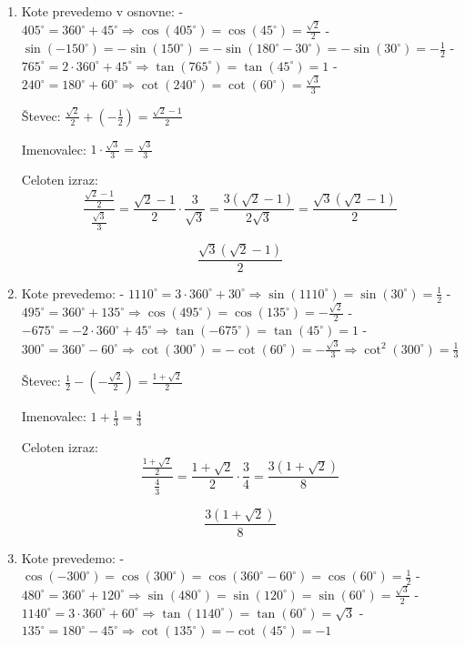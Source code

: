 \documentclass[a4paper,12pt]{letter}
\begin{document}
\newpage

\begin{enumerate}
\item 
Kote prevedemo v osnovne:
- \(405^\circ = 360^\circ + 45^\circ \Rightarrow \cos(405^\circ) = \cos(45^\circ) = \frac{\sqrt{2}}{2}\)
- \(\sin(-150^\circ) = -\sin(150^\circ) = -\sin(180^\circ - 30^\circ) = -\sin(30^\circ) = -\frac{1}{2}\)
- \(765^\circ = 2 \cdot 360^\circ + 45^\circ \Rightarrow \tan(765^\circ) = \tan(45^\circ) = 1\)
- \(240^\circ = 180^\circ + 60^\circ \Rightarrow \cot(240^\circ) = \cot(60^\circ) = \frac{\sqrt{3}}{3}\)

Števec: \(\frac{\sqrt{2}}{2} + \left(-\frac{1}{2}\right) = \frac{\sqrt{2} - 1}{2}\)

Imenovalec: \(1 \cdot \frac{\sqrt{3}}{3} = \frac{\sqrt{3}}{3}\)

Celoten izraz:
\[
\frac{\frac{\sqrt{2} - 1}{2}}{\frac{\sqrt{3}}{3}} = \frac{\sqrt{2} - 1}{2} \cdot \frac{3}{\sqrt{3}} = \frac{3(\sqrt{2} - 1)}{2\sqrt{3}} = \frac{\sqrt{3}(\sqrt{2} - 1)}{2}
\]

\[
\boxed{\frac{\sqrt{3}(\sqrt{2} - 1)}{2}}
\]

\item 
Kote prevedemo:
- \(1110^\circ = 3 \cdot 360^\circ + 30^\circ \Rightarrow \sin(1110^\circ) = \sin(30^\circ) = \frac{1}{2}\)
- \(495^\circ = 360^\circ + 135^\circ \Rightarrow \cos(495^\circ) = \cos(135^\circ) = -\frac{\sqrt{2}}{2}\)
- \(-675^\circ = -2 \cdot 360^\circ + 45^\circ \Rightarrow \tan(-675^\circ) = \tan(45^\circ) = 1\)
- \(300^\circ = 360^\circ - 60^\circ \Rightarrow \cot(300^\circ) = -\cot(60^\circ) = -\frac{\sqrt{3}}{3} \Rightarrow \cot^2(300^\circ) = \frac{1}{3}\)

Števec: \(\frac{1}{2} - \left(-\frac{\sqrt{2}}{2}\right) = \frac{1 + \sqrt{2}}{2}\)

Imenovalec: \(1 + \frac{1}{3} = \frac{4}{3}\)

Celoten izraz:
\[
\frac{\frac{1 + \sqrt{2}}{2}}{\frac{4}{3}} = \frac{1 + \sqrt{2}}{2} \cdot \frac{3}{4} = \frac{3(1 + \sqrt{2})}{8}
\]


\[
\boxed{\frac{3(1 + \sqrt{2})}{8}}
\]

\item 

Kote prevedemo:
- \(\cos(-300^\circ) = \cos(300^\circ) = \cos(360^\circ - 60^\circ) = \cos(60^\circ) = \frac{1}{2}\)
- \(480^\circ = 360^\circ + 120^\circ \Rightarrow \sin(480^\circ) = \sin(120^\circ) = \sin(60^\circ) = \frac{\sqrt{3}}{2}\)
- \(1140^\circ = 3 \cdot 360^\circ + 60^\circ \Rightarrow \tan(1140^\circ) = \tan(60^\circ) = \sqrt{3}\)
- \(135^\circ = 180^\circ - 45^\circ \Rightarrow \cot(135^\circ) = -\cot(45^\circ) = -1\)


\end{enumerate}
\end{document}
